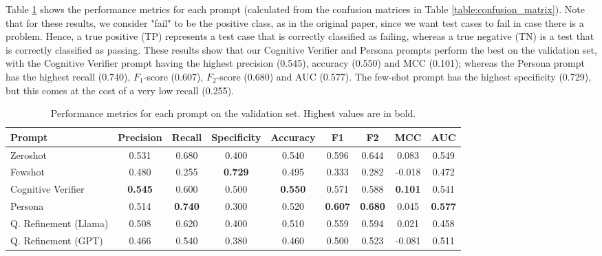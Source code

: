 \documentclass[a4paper]{article}
\begin{document}
Table \ref{table:prompt_metrics} shows the performance metrics for each prompt (calculated from the confusion matrices in Table \ref{table:confusion_matrix}). Note that for these results, we consider "fail" to be the positive class, as in the original paper, since we want test cases to fail in case there is a problem. Hence, a true positive (TP) represents a test case that is correctly classified as failing, whereas a true negative (TN) is a test that is correctly classified as passing. These results show that our Cognitive Verifier and Persona prompts perform the best on the validation set, with the Cognitive Verifier prompt having the highest precision (0.545), accuracy (0.550) and MCC (0.101); whereas the Persona prompt has the highest recall (0.740), $F_1$-score (0.607), $F_2$-score (0.680) and AUC (0.577). The few-shot prompt has the highest specificity (0.729), but this comes at the cost of a very low recall (0.255). 
\begin{table}[H]
	\centering
	\caption{Performance metrics for each prompt on the validation set. Highest values are in bold.}
	\label{table:prompt_metrics}
	\begin{tabularx}{\textwidth}{|>{\small}X|>{\small}c|>{\small}c|>{\small}c|>{\small}c|>{\small}c|>{\small}c|>{\small}c|>{\small}c|}
		\hline
		\textbf{Prompt} & \textbf{Precision} & \textbf{Recall} & \textbf{Specificity} & \textbf{Accuracy} & \textbf{F1} & \textbf{F2} & \textbf{MCC} & \textbf{AUC} \\
		\hline
		Zeroshot & 0.531 & 0.680 & 0.400 & 0.540 & 0.596 & 0.644 & 0.083 & 0.549 \\
		Fewshot & 0.480 & 0.255 & \textbf{0.729} & 0.495 & 0.333 & 0.282 & -0.018 & 0.472 \\
		Cognitive Verifier & \textbf{0.545} & 0.600 & 0.500 & \textbf{0.550} & 0.571 & 0.588 & \textbf{0.101} & 0.541 \\
		Persona & 0.514 & \textbf{0.740} & 0.300 & 0.520 & \textbf{0.607} & \textbf{0.680} & 0.045 & \textbf{0.577} \\
		Q. Refinement (Llama) & 0.508 & 0.620 & 0.400 & 0.510 & 0.559 & 0.594 & 0.021 & 0.458 \\
		Q. Refinement (GPT) & 0.466 & 0.540 & 0.380 & 0.460 & 0.500 & 0.523 & -0.081 & 0.511 \\
		\hline
	\end{tabularx}
\end{table}
\end{document}
